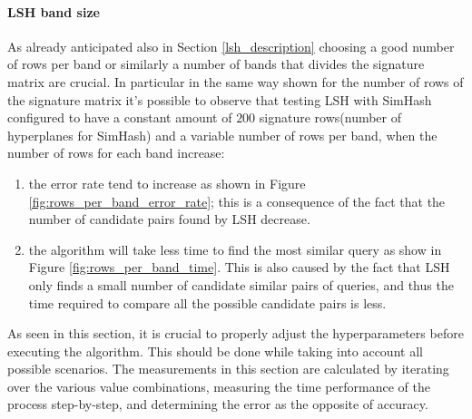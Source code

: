 \paragraph{LSH band size} As already anticipated also in Section \ref{lsh_description} choosing a good number of rows per band or similarly a number of bands that divides the signature matrix are crucial. In particular in the same way shown for the number of rows of the signature matrix it's possible to observe that testing LSH with SimHash configured to have a constant amount of $200$ signature rows(number of hyperplanes for SimHash) and a variable number of rows per band, when the number of rows for each band increase:
\begin{enumerate}
    \item the error rate tend to increase as shown in Figure \ref{fig:rows_per_band_error_rate}; this is a consequence of the fact that the number of candidate pairs found by LSH decrease.
    \item the algorithm will take less time to find the most similar query as show in Figure \ref{fig:rows_per_band_time}. This is also caused by the fact that LSH only finds a small number of candidate similar pairs of queries, and thus the time required to compare all the possible candidate pairs is less.
\end{enumerate}





As seen in this section, it is crucial to properly adjust the hyperparameters before executing the algorithm. This should be done while taking into account all possible scenarios. The measurements in this section are calculated by iterating over the various value combinations, measuring the time performance of the process step-by-step, and determining the error as the opposite of accuracy. 

